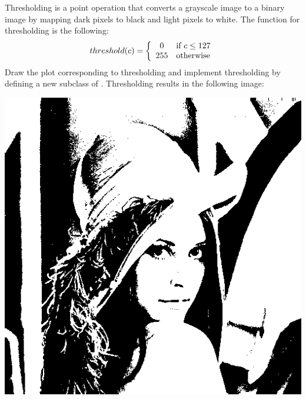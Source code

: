 \documentclass{book}
\begin{document}
\begin{exercise}
Thresholding is a point operation that converts a grayscale image to a binary image by mapping dark pixels to black and light pixels to white. The function for thresholding is the following:
$$threshold(c) = \left\{\begin{array}{c l}
  0 & \text{if $c \leq 127$}\\
  255 & \text{otherwise}\\
\end{array}
\right.$$
Draw the plot corresponding to thresholding and implement thresholding by defining a new subclass  of . Thresholding  results in the following image:
\begin{center}
\includegraphics[scale=0.10]{lena-binary.png}
\end{center}
\end{exercise}
\end{document}
